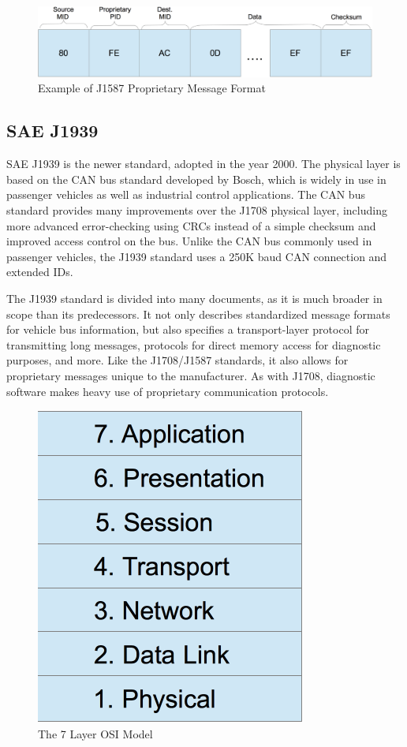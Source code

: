 \begin{figure}[h]
  \centering
  \includegraphics[scale=0.6]{J1708Proprietary}
  \caption{Example of J1587 Proprietary Message Format}
  \label{fig:j1587-proprietary}
\end{figure}

\subsection{SAE J1939}

SAE J1939\cite{J1939-71} is the newer standard, adopted in the year 2000. The physical layer is based on the CAN bus standard developed by Bosch\cite{Bosch1991}, which is widely in use
in passenger vehicles as well as industrial control applications. The CAN bus standard provides many improvements over the J1708 physical layer,
including more advanced error-checking using CRCs instead of a simple checksum and improved access control on the bus. Unlike the CAN bus commonly used in
passenger vehicles, the J1939 standard uses a 250K baud CAN connection and extended IDs.

The J1939 standard is divided into many documents, as it is much broader in scope than its predecessors. It not only describes standardized
message formats for vehicle bus information, but also specifies a transport-layer protocol for transmitting long messages, protocols for
direct memory access for diagnostic purposes, and more. Like the J1708/J1587 standards, it also allows for proprietary messages unique
to the manufacturer. As with J1708, diagnostic software makes heavy use of proprietary communication protocols.

\begin{figure}[h]
  \centering
  \includegraphics[scale=.75]{OSIModel}
  \caption{The 7 Layer OSI Model\cite{Day1983}}
  \label{fig:osimodel}
\end{figure}

